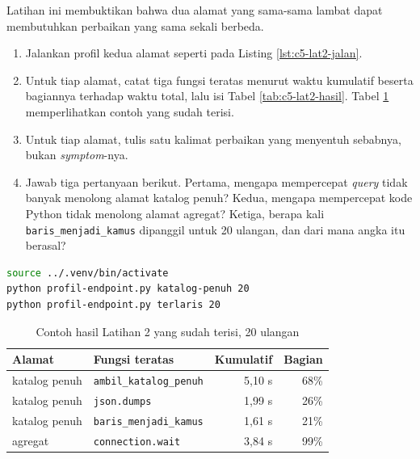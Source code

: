 Latihan ini membuktikan bahwa dua alamat yang sama-sama lambat dapat
membutuhkan perbaikan yang sama sekali berbeda.

\begin{enumerate}
  \item Jalankan profil kedua alamat seperti pada Listing
        \ref{lst:c5-lat2-jalan}.
  \item Untuk tiap alamat, catat tiga fungsi teratas menurut waktu kumulatif
        beserta bagiannya terhadap waktu total, lalu isi Tabel \ref{tab:c5-lat2-hasil}. Tabel \ref{tab:c5-lat2-contoh}
        memperlihatkan contoh yang sudah terisi.
  \item Untuk tiap alamat, tulis satu kalimat perbaikan yang menyentuh
        sebabnya, bukan \textit{symptom}-nya.
  \item Jawab tiga pertanyaan berikut. Pertama, mengapa mempercepat \textit{query}
        tidak banyak menolong alamat katalog penuh? Kedua, mengapa
        mempercepat kode Python tidak menolong alamat agregat? Ketiga,
        berapa kali \texttt{baris\_menjadi\_kamus} dipanggil untuk 20
        ulangan, dan dari mana angka itu berasal?
\end{enumerate}

\begin{lstlisting}[language=bash, caption={Memprofil dua alamat, tersedia di \berkas{sources/chapter05/profil-endpoint.py}}, label={lst:c5-lat2-jalan}]
source ../.venv/bin/activate
python profil-endpoint.py katalog-penuh 20
python profil-endpoint.py terlaris 20
\end{lstlisting}

\begin{table}[!htb]
  \centering
  \caption{Contoh hasil Latihan 2 yang sudah terisi, 20 ulangan}
  \label{tab:c5-lat2-contoh}
  \begin{tabularx}{\textwidth}{lXrr}
    \hline
    \textbf{Alamat} & \textbf{Fungsi teratas} & \textbf{Kumulatif} & \textbf{Bagian} \\
    \hline
    katalog penuh & \texttt{ambil\_katalog\_penuh} & 5,10 s & 68\% \\
    \hline
    katalog penuh & \texttt{json.dumps} & 1,99 s & 26\% \\
    \hline
    katalog penuh & \texttt{baris\_menjadi\_kamus} & 1,61 s & 21\% \\
    \hline
    agregat & \texttt{connection.wait} & 3,84 s & 99\% \\
    \hline
  \end{tabularx}
\end{table}

